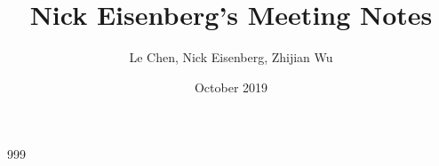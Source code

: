\documentclass[a4paper,11pt]{article}
\title{Nick Eisenberg's Meeting Notes}
\author{Le Chen, Nick Eisenberg, Zhijian Wu}
\date{October 2019}
\numberwithin{equation}{section}
\theoremstyle{plain}
\theoremstyle{definition}
\numberwithin{NQ}{section}
\numberwithin{LQ}{section}
\numberwithin{ZQ}{section}
\begin{document}
	

\begin{thebibliography}{999}
	\bibitem{}
\end{thebibliography}
\end{document}
